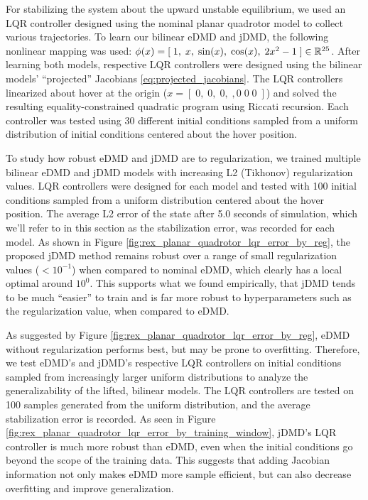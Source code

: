 \documentclass{article}
\begin{document}
      For stabilizing the system about the upward unstable equilibrium, we used an LQR controller
      designed using the nominal planar quadrotor model to collect various trajectories. To learn
      our bilinear eDMD and jDMD, the following nonlinear mapping was used: $\phi(x) = [\; 1,\;
      x,\; \sin(x),\; \cos(x),\; 2x^{2}-1\; ] \in \mathbb{R}^{25}$. After learning both models, respective
      LQR controllers were designed using the bilinear models' ``projected'' Jacobians
      \eqref{eq:projected_jacobians}. The LQR controllers linearized about hover at the origin ($x
      = [\;0,\; 0,\; 0,\;, 0\;  0\;  0\;]$) and solved the resulting equality-constrained
      quadratic program using Riccati recursion. Each controller was tested using 30 different
      initial conditions sampled from a uniform distribution of initial conditions centered about
      the hover position.
      
      To study how robust eDMD and jDMD are to regularization, we trained multiple bilinear eDMD
      and jDMD models with increasing L2 (Tikhonov) regularization values. LQR controllers were
      designed for each model and tested with 100 initial conditions sampled from a uniform
      distribution centered about the hover position. The average L2 error of the state after 5.0
      seconds of simulation, which we'll refer to in this section as the stabilization error, was
      recorded for each model. As shown in Figure
      \ref{fig:rex_planar_quadrotor_lqr_error_by_reg}, the proposed jDMD method remains robust
      over a range of small regularization values ($<10^{-1}$) when compared to nominal eDMD, which 
      clearly has a local optimal around $10^0$. This supports what we found empirically, that 
      jDMD tends to be much ``easier'' to train and is far more robust to hyperparameters such as 
      the regularization value, when compared to eDMD.
      
      As suggested by Figure \ref{fig:rex_planar_quadrotor_lqr_error_by_reg}, eDMD without
      regularization performs best, but may be prone to overfitting. Therefore, we test eDMD's and
      jDMD's respective LQR controllers on initial conditions sampled from increasingly larger
      uniform distributions to analyze the generalizability of the lifted, bilinear models. The
      LQR controllers are tested on 100 samples generated from the uniform distribution, and the
      average stabilization error is recorded. As seen in Figure
      \ref{fig:rex_planar_quadrotor_lqr_error_by_training_window}, jDMD's LQR controller is much
      more robust than eDMD, even when the initial conditions go beyond the scope of the training
      data. This suggests that adding Jacobian information not only makes eDMD more sample
      efficient, but can also decrease overfitting and improve generalization. 
      
\end{document}
